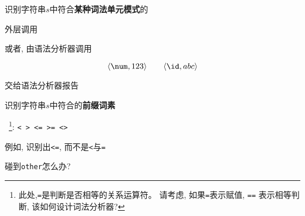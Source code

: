 \begin{frame}{}
\end{frame}

\begin{frame}{}
  \begin{center}
    识别字符串$s$中符合{\bf 某种词法单元模式}的

    \vspace{1.00cm}
    外层调用 

    \vspace{0.60cm}
    或者, 由语法分析器调用 

    \vspace{0.20cm}
  \end{center}
\end{frame}

\begin{frame}{}
  \begin{center}

    \pause
    \[
      \langle \num, 123 \rangle \qquad \langle \id, abc \rangle
    \]

    \pause
    \vspace{0.80cm}
    交给语法分析器报告
  \end{center}
\end{frame}

\begin{frame}{}
  \begin{center}
    识别字符串$s$中符合的{\bf 前缀词素}

    \vspace{0.30cm}
    \relop~\footnote{此处,\texttt{=}是判断是否相等的关系运算符。
    请考虑, 如果\texttt{=}表示赋值, \texttt{==} 表示相等判断, 该如何设计词法分析器?}:
    \texttt{< \quad > \quad <= \quad >= \quad \red{=} \quad <>}

    \pause
    \vspace{0.30cm}

    \pause
     例如, 识别出\texttt{<=}, 而不是\texttt{<}与\texttt{=}

    \pause
     碰到\texttt{other}怎么办?
  \end{center}
\end{frame}

